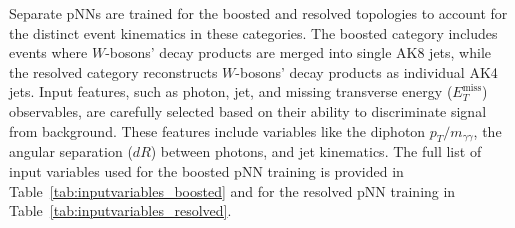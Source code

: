 Separate pNNs are trained for the boosted and resolved topologies to account for the distinct event kinematics in these categories.
The boosted category includes events where \(W\)-bosons' decay products are merged into single AK8 jets, while the resolved category reconstructs \(W\)-bosons' decay products as individual AK4 jets.
Input features, such as photon, jet, and missing transverse energy (\(E_T^{\text{miss}}\)) observables, are carefully selected based on their ability to discriminate signal from background. These features include variables like the diphoton \(p_T/m_{\gamma\gamma}\), the angular separation (\(dR\)) between photons, and jet kinematics. The full list of input variables used for the boosted pNN training is provided in Table~\ref{tab:inputvariables_boosted} and for the resolved pNN training in Table~\ref{tab:inputvariables_resolved}.
